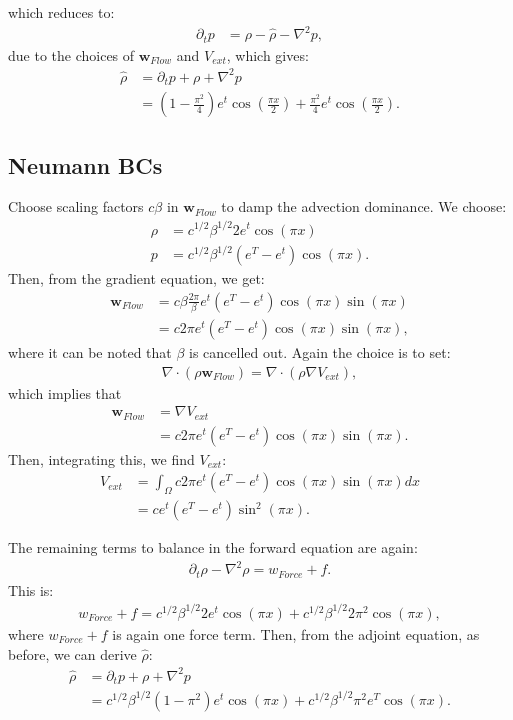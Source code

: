 \documentclass[11pt, a4paper]{article}
\theoremstyle{definition}
\newcommand{\Sta}{\rho}
\newcommand{\Adj}{p}
\begin{document}
which reduces to:
\begin{align*}
\partial_t \Adj &= \Sta - \hat \Sta  -  \nabla^2 \Adj,
\end{align*}
due to the choices of $\mathbf{w}_{Flow}$ and $V_{ext}$, which gives:
\begin{align*}
 \hat \Sta &= \partial_t \Adj +\Sta   +  \nabla^2 \Adj\\
 &=(1-\frac{\pi^2}{4})e^t\cos(\frac{\pi x}{2}) +\frac{\pi^2}{4}e^t \cos(\frac{\pi x}{2}).
\end{align*}












\subsection*{Neumann BCs}
Choose scaling factors $c \beta $ in $\mathbf{w}_{Flow }$ to damp the advection dominance.
We choose:
\begin{align*}
\Sta &= c^{1/2} \beta^{1/2} 2 e^t \cos(\pi x)\\
\Adj &= c^{1/2} \beta^{1/2}(e^T-e^t) \cos(\pi x).
\end{align*}
Then, from the gradient equation, we get:
\begin{align*}
\mathbf{w}_{Flow }&= c \beta \frac{2\pi}{\beta}e^t(e^T -e^t)\cos(\pi x) \sin(\pi x)\\
&= c 2\pi e^t(e^T -e^t)\cos(\pi x) \sin(\pi x),
\end{align*}
where it can be noted that $\beta$ is cancelled out.
Again the choice is to set:
\begin{align*}
\nabla \cdot (\rho \mathbf{w}_{Flow}) = \nabla \cdot (\Sta \nabla V_{ext}),
\end{align*}
which implies that
\begin{align*}
\mathbf{w}_{Flow} &= \nabla V_{ext} \\
&= c 2\pi e^t(e^T -e^t)\cos(\pi x) \sin(\pi x).
\end{align*}
Then, integrating this, we find $V_{ext}$:
\begin{align*}
V_{ext} &= \int_\Omega c 2\pi e^t(e^T -e^t)\cos(\pi x) \sin(\pi x) dx\\
&=c e^t(e^T -e^t)\sin^2(\pi x).
\end{align*}

The remaining terms to balance in the forward equation are again:
\begin{align*}
\partial_t \Sta - \nabla^2 \Sta  = {w}_{Force} + f.
\end{align*}
This is:
\begin{align*}
{w}_{Force} + f= c^{1/2} \beta^{1/2}2e^t \cos(\pi x) + c^{1/2} \beta^{1/2} 2\pi^2 \cos (\pi x),
\end{align*}
where ${w}_{Force} + f$ is again one force term.
Then, from the adjoint equation, as before, we can derive $\hat \Sta$:
\begin{align*}
\hat \Sta &= \partial_t \Adj +\Sta   +  \nabla^2 \Adj\\
&= c^{1/2} \beta^{1/2} (1 -\pi^2)e^t \cos(\pi x) + c^{1/2} \beta^{1/2}\pi^2e^T \cos(\pi x).
\end{align*}
\end{document}
